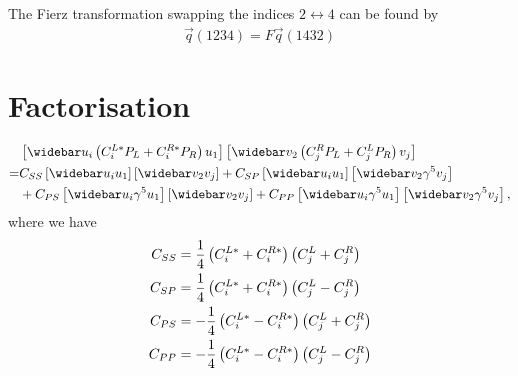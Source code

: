 \documentclass[english,notitlepage]{article}
\begin{document}
    The Fierz transformation swapping the indices \(2 \leftrightarrow 4\) can be found by
    \begin{align}
        \vec{q}(1234) = F \vec{q}(1432)
    \end{align}

\section{Factorisation}

    \begin{align}
        \nonumber
          & \bclosed{\wbar{u}_i \pclosed{C^{L*}_i P_L + C^{R*}_i P_R} u_1} \bclosed{\wbar{v}_2 \pclosed{C^{R}_j P_L + C^{L}_j P_R} v_j}                     \\
        \nonumber
        = & C_{SS}\bclosed{\wbar{u}_i u_1} \bclosed{\wbar{v}_2 v_j} + C_{SP}\bclosed{\wbar{u}_i u_1} \bclosed{\wbar{v}_2 \gamma^5 v_j}                      \\
          & + C_{PS}\bclosed{\wbar{u}_i \gamma^5 u_1} \bclosed{\wbar{v}_2 v_j} + C_{PP}\bclosed{\wbar{u}_i \gamma^5 u_1} \bclosed{\wbar{v}_2 \gamma^5 v_j},
    \end{align}
    where we have
    \begin{subequations}
        \begin{align}
            C_{SS} & = \frac{1}{4} \left(C^{L*}_i + C^{R*}_i\right)\left(C^{L}_j + C^{R}_j\right)  \\
            C_{SP} & = \frac{1}{4} \left(C^{L*}_i + C^{R*}_i\right)\left(C^{L}_j - C^{R}_j\right)  \\
            C_{PS} & = -\frac{1}{4} \left(C^{L*}_i - C^{R*}_i\right)\left(C^{L}_j + C^{R}_j\right) \\
            C_{PP} & = -\frac{1}{4} \left(C^{L*}_i - C^{R*}_i\right)\left(C^{L}_j - C^{R}_j\right)
        \end{align}
    \end{subequations}
\end{document}
